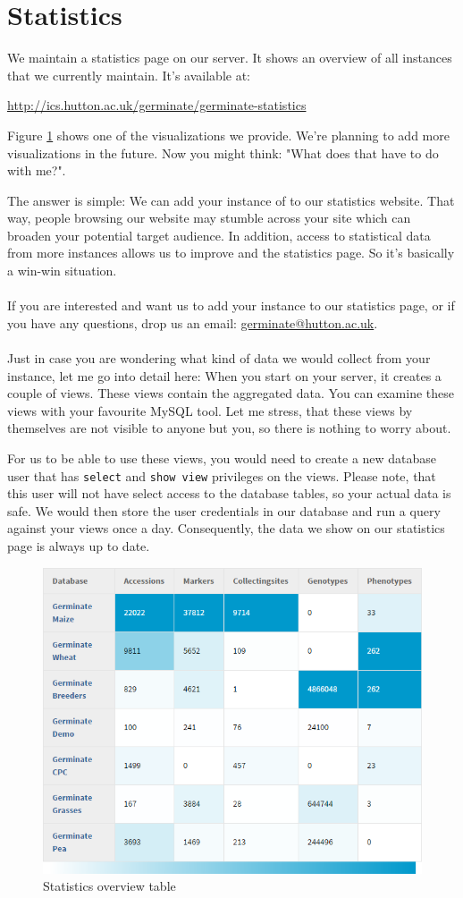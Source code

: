\section{Statistics}
We maintain a {\germinate} statistics page on our server. It shows an overview of all {\germinate} instances that we currently maintain. It's available at:
\begin{center}
	\url{http://ics.hutton.ac.uk/germinate/germinate-statistics}
\end{center}
\noindent
Figure \ref{fig:statistics-overview-table} shows one of the visualizations we provide. We're planning to add more visualizations in the future. Now you might think: "What does that have to do with me?".

The answer is simple: We can add your instance of {\germinate} to our statistics website. That way, people browsing our website may stumble across your site which can broaden your potential target audience. In addition, access to statistical data from more {\germinate} instances allows us to improve {\germinate} and the statistics page. So it's basically a win-win situation.\\
\\
If you are interested and want us to add your {\germinate} instance to our statistics page, or if you have any questions, drop us an email: \url{germinate@hutton.ac.uk}.\\
\\
Just in case you are wondering what kind of data we would collect from your {\germinate} instance, let me go into detail here: When you start {\germinate} on your server, it creates a couple of views. These views contain the aggregated data. You can examine these views with your favourite MySQL tool. Let me stress, that these views by themselves are not visible to anyone but you, so there is nothing to worry about.

For us to be able to use these views, you would need to create a new database user that has \texttt{select} and \texttt{show view} privileges on the views. Please note, that this user will not have select access to the database tables, so your actual data is safe. We would then store the user credentials in our database and run a query against your views once a day. Consequently, the data we show on our statistics page is always up to date.

\begin{figure}
	\centering
	\includegraphics[scale=0.6]{img/statistics/overview-table.png}
	\caption{Statistics overview table}
	\label{fig:statistics-overview-table}
\end{figure}